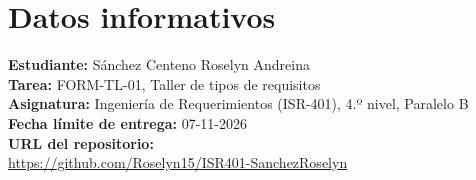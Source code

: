 \documentclass[11pt,a4paper]{article}
\begin{document}
\section*{Datos informativos}
\textbf{Estudiante:} Sánchez Centeno Roselyn Andreina\\[4pt]
\textbf{Tarea:} FORM-TL-01, Taller de tipos de requisitos\\[4pt]
\textbf{Asignatura:} Ingeniería de Requerimientos (ISR-401), 4.º nivel, Paralelo B\\[4pt]
\textbf{Fecha límite de entrega:} 07-11-2026\\[8pt]
\textbf{URL del repositorio:}\\[2pt]
{\footnotesize\url{https://github.com/Roselyn15/ISR401-SanchezRoselyn}}
\end{document}

